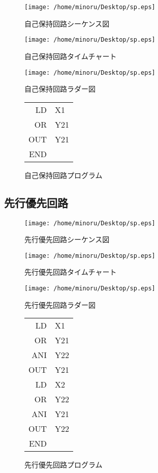 \documentclass{jsarticle}
\begin{document}
\begin{figure}[hbtp]
 \texttt{[image: /home/minoru/Desktop/sp.eps]}
 \caption{自己保持回路シーケンス図}
\end{figure}
\begin{figure}[hbtp]
 \texttt{[image: /home/minoru/Desktop/sp.eps]}
 \caption{自己保持回路タイムチャート}
\end{figure}
\begin{figure}[hbtp]
 \texttt{[image: /home/minoru/Desktop/sp.eps]}
 \caption{自己保持回路ラダー図}
\end{figure}
\begin{figure}[htbp]
\centering
\begin{tabular}{rl}
LD&X1\\
OR&Y21\\
OUT&Y21\\
END&\\
\end{tabular}
\caption{自己保持回路プログラム}
\end{figure}
\newpage
\subsection{先行優先回路}
\begin{figure}[htbp]
 \centering
 \texttt{[image: /home/minoru/Desktop/sp.eps]}
 \caption{先行優先回路シーケンス図}
\end{figure}
\begin{figure}[htbp]
 \texttt{[image: /home/minoru/Desktop/sp.eps]}
 \caption{先行優先回路タイムチャート}
\end{figure}
\begin{figure}[htbp]
 \texttt{[image: /home/minoru/Desktop/sp.eps]}
 \caption{先行優先回路ラダー図}
\end{figure}
\begin{figure}[htbp]
\centering
\begin{tabular}{rl}
LD&X1\\
OR&Y21\\
ANI&Y22\\
OUT&Y21\\
LD&X2\\
OR&Y22\\
ANI&Y21\\
OUT&Y22\\
END&\\
\end{tabular}
\caption{先行優先回路プログラム}
\end{figure}
\end{document}
